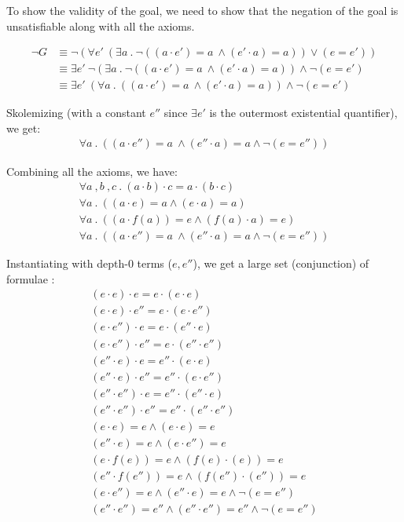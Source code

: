\documentclass[12pt,letterpaper, onecolumn]{exam}
\begin{document}
\begin{questions}
	To show the validity of the goal, we need to show that the negation of the goal is unsatisfiable along with all the axioms.

	\begin{align*}
		\neg G &\equiv \neg (\forall e' \: (\exists a \:.\: \neg((a \cdot e') = a \: \land (e' \cdot a) = a)) \lor (e = e')) \\
		&\equiv \exists e' \: \neg (\exists a \:.\: \neg((a \cdot e') = a \: \land (e' \cdot a) = a)) \land \neg (e = e') \\
		&\equiv \exists e' \: (\forall a \:.\: ((a \cdot e') = a \: \land (e' \cdot a) = a)) \land \neg (e = e')
	\end{align*}

	Skolemizing (with a constant $ e'' $ since $\exists e'$ is the outermost existential quantifier), we get:
	\begin{align*}
		\forall a \:.\: ((a \cdot e'') = a \: \land (e'' \cdot a) = a \land \neg (e = e''))
	\end{align*}

	Combining all the axioms, we have:
	\begin{align*}
		\forall a \:, b \:, c \:.\: (a \cdot b) \cdot c = a \cdot (b \cdot c) \\
		\forall a \:.\: ((a \cdot e) = a \land (e \cdot a) = a) \\
		\forall a \:.\: ((a \cdot f(a)) = e \land (f(a) \cdot a) = e) \\
		\forall a \:.\: ((a \cdot e'') = a \: \land (e'' \cdot a) = a \land \neg (e = e''))
	\end{align*}

	Instantiating with depth-0 terms ($e, e''$), we get a large set (conjunction) of formulae :
	\begin{align*}
		(e \cdot e) \cdot e = e \cdot (e \cdot e) \\
		(e \cdot e) \cdot e'' = e \cdot (e \cdot e'') \\
		(e \cdot e'') \cdot e = e \cdot (e'' \cdot e) \\
		(e \cdot e'') \cdot e'' = e \cdot (e'' \cdot e'') \\
		(e'' \cdot e) \cdot e = e'' \cdot (e \cdot e) \\
		(e'' \cdot e) \cdot e'' = e'' \cdot (e \cdot e'') \\
		(e'' \cdot e'') \cdot e = e'' \cdot (e'' \cdot e) \\
		(e'' \cdot e'') \cdot e'' = e'' \cdot (e'' \cdot e'') \\
		(e \cdot e) = e \land (e \cdot e) = e \\
		(e'' \cdot e) = e \land (e \cdot e'') = e \\
		(e \cdot f(e)) = e \land (f(e) \cdot (e)) = e \\
		(e'' \cdot f(e'')) = e \land (f(e'') \cdot (e'')) = e \\
		(e \cdot e'') = e \land (e'' \cdot e) = e \land \neg (e = e'') \\
		(e'' \cdot e'') = e'' \land (e'' \cdot e'') = e'' \land \neg (e = e'')
	\end{align*}
	

\end{questions}
\end{document}
